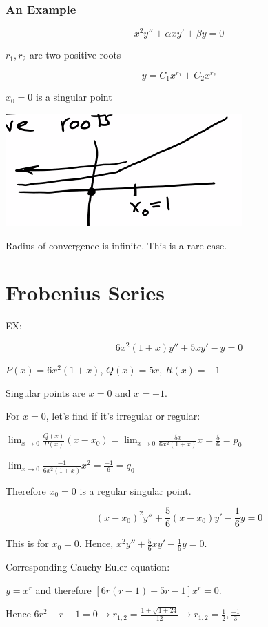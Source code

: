 \documentclass{article}
\begin{document}
\subsubsection{An Example}

$$x^2 y'' + \alpha x y' + \beta y = 0$$

$r_1, r_2$ are two positive roots

$$y = C_1 x^{r_1} + C_2 x^{r_2}$$

$x_0 = 0$ is a singular point

\includegraphics[width = 0.4 \textwidth]{image3.png}

Radius of convergence is infinite. This is a rare case. 

\section{Frobenius Series}

EX: 

$$ 6x^2 (1+x) y'' + 5xy' - y = 0$$

$P(x) = 6x^2 (1+x)$, $Q(x) = 5x$, $R(x) = -1$

Singular points are $x = 0$ and $x = -1$. 

For $x = 0$, let's find if it's irregular or regular:

$\lim_{x \to 0} \frac{Q(x)}{P(x)}(x - x_0) = \lim_{x \to 0} \frac{5x}{6x^2 (1+x)} x = \frac{5}{6} = p_0$

$\lim_{x \to 0} \frac{-1}{6x^2 (1+x)} x^2 = \frac{-1}{6} = q_0$

Therefore $x_0 = 0$ is a regular singular point. 

$$(x - x_0)^2 y'' + \frac{5}{6} (x - x_0) y' - \frac{1}{6} y = 0$$

This is for $x_0 = 0$. Hence, $x^2 y'' + \frac{5}{6} x y' - \frac{1}{6} y = 0$. 

\hfill \break 

Corresponding Cauchy-Euler equation:

$y = x^r$ and therefore $\left[ 6r(r-1) + 5r - 1 \right] x^r = 0$. 

Hence $6r^2 - r - 1 = 0 \longrightarrow r_{1,2} = \frac{1 \pm \sqrt{1+24}}{12} \longrightarrow r_{1,2} = \frac{1}{2}, \frac{-1}{3}$
\end{document}
